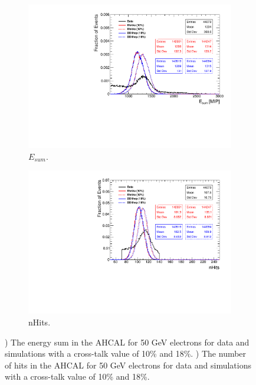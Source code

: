 \begin{figure}[htbp!]
	\centering
	\begin{subfigure}[t]{0.49\textwidth}
		\includegraphics[width=1.\linewidth]{../Thesis_Plots/Timing/Electrons/Plots/Comparison_EnergySum_Xtalk_electrons50GeV.pdf}
		\caption{$E_{sum}$.} \label{fig:e50Evis}
	\end{subfigure}
	\hfill
	\begin{subfigure}[t]{0.49\textwidth}
		\includegraphics[width=1.\linewidth]{../Thesis_Plots/Timing/Electrons/Plots/Comparison_nHits_Xtalk_electrons50GeV.pdf}
		\caption{nHits.} \label{fig:e50nHits}
	\end{subfigure}
	\caption{) The energy sum in the AHCAL for 50 GeV electrons for data and simulations with a cross-talk value of 10\% and 18\%. ) The number of hits in the AHCAL for 50 GeV electrons for data and simulations with a cross-talk value of 10\% and 18\%.}
	\label{fig:e50Val}
\end{figure}
